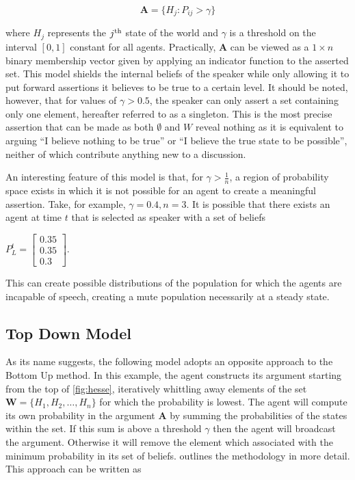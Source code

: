 \begin{equation}
    \mathbf{A} = \{ H_j: P_{ij} > \gamma  \}
\end{equation}

where $H_j$ represents the $j^{\textnormal{th}}$ state of the world and $\gamma$ is a threshold on the interval $[0,1]$ constant for all agents. Practically, $\mathbf{A}$ can be viewed as a $1 \times n$ binary membership vector given by applying an indicator function to the asserted set. This model shields the internal beliefs of the speaker while only allowing it to put forward assertions it believes to be true to a certain level. It should be noted, however, that for values of $\gamma > 0.5$, the speaker can only assert a set containing only one element, hereafter referred to as a singleton. This is the most precise assertion that can be made as both $\emptyset$ and $W$ reveal nothing as it is equivalent to arguing ``I believe nothing to be true'' or ``I believe the true state to be possible'', neither of which contribute anything new to a discussion. 

An interesting feature of this model is that, for $\gamma > \frac{1}{n}$, a region of probability space exists in which it is not possible for an agent to create a meaningful assertion. Take, for example, $\gamma = 0.4, n=3$. It is possible that there exists an agent at time $t$ that is selected as speaker with a set of beliefs

\begin{center}
    
$P^t_L = \begin{bmatrix}
    0.35\\
    0.35\\
    0.3
\end{bmatrix}.$
\end{center}

This can create possible distributions of the population for which the agents are incapable of speech, creating a mute population necessarily at a steady state. 

\subsection*{Top Down Model}

As its name suggests, the following model adopts an opposite approach to the Bottom Up method. In this example, the agent constructs its argument starting from the top of \cref{fig:hesse}, iteratively whittling away elements of the set $\mathbf{W} = \{H_1, H_2, \dots, H_n  \}$ for which the probability is lowest. The agent will compute its own probability in the argument $\mathbf{A}$ by summing the probabilities of the states within the set. If this sum is above a threshold $\gamma$ then the agent will broadcast the argument. Otherwise it will remove the element which associated with the minimum probability in its set of beliefs.  outlines the methodology in more detail. This approach can be written as


